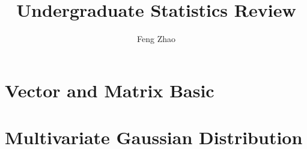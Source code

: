 \documentclass{book}
\title{Undergraduate Statistics Review}
\author{Feng Zhao}
\begin{document}
\maketitle
\chapter{Vector and Matrix Basic}

\chapter{Multivariate Gaussian Distribution}

\end{document}
